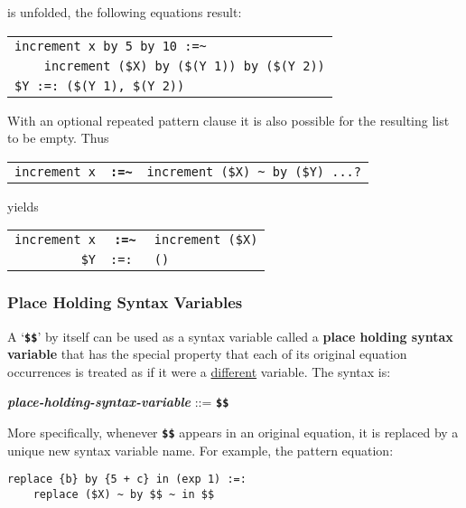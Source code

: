 \documentclass[12pt]{article}
\newcommand{\TT}[1]{{\tt \bfseries #1}}
\newcommand{\key}[1]{{\rm \bfseries #1}}
\newcommand{\ttkey}[1]{{\tt \bfseries #1}}
\newcommand{\emkey}[1]{{\em \bfseries #1}}
\newcommand{\TILDE}{\textasciitilde}
\newenvironment{indpar}[1][0.3in]%
	{\begin{list}{}%
		     {\setlength{\itemsep}{0in}%
		      \setlength{\topsep}{0in}%
		      \setlength{\parsep}{1ex}%
		      \setlength{\labelwidth}{#1}%
		      \setlength{\leftmargin}{#1}%
		      \addtolength{\leftmargin}{\labelsep}}%
	 \item}%
	{\end{list}}
\begin{document}
is unfolded, the following equations result:

\begin{center}
\begin{tabular}{l}
\verb/increment x by 5 by 10 :=~/ \\
\verb/    increment ($X) by ($(Y 1)) by ($(Y 2))/ \\
\verb/$Y :=: ($(Y 1), $(Y 2))/
\end{tabular}
\end{center}

With an optional repeated pattern clause it is also possible for the
resulting list to be empty.  Thus

\begin{center}
\begin{tabular}{rcl}
\verb/increment x/ & \TT{:=\TILDE}
			      & \verb/increment ($X) ~ by ($Y) ...?/ \\
\end{tabular}
\end{center}

yields

\begin{center}
\begin{tabular}{rcl}
\verb/increment x/ & \TT{:=\TILDE}
			      & \verb/increment ($X)/ \\
\verb/$Y/ & \tt :=: & \verb|()|
\end{tabular}
\end{center}

\subsubsection{Place Holding Syntax Variables}
\label{PLACE-HOLDING-SYNTAX-VARIABLES}

A `\TT{\$\$}' by itself can be used as a syntax variable called
a \key{place holding syntax variable} that has the special
property that each of its original equation occurrences
is treated as if it were a \underline{different} variable.  The syntax is:

\begin{indpar}
\emkey{place-holding-syntax-variable} ::= \ttkey{\$\$}
\end{indpar}

More specifically, whenever \TT{\$\$} appears in an original
equation, it is replaced by a unique new syntax variable name. 
For example, the pattern equation:

\begin{indpar}
\verb/replace {b} by {5 + c} in (exp 1) :=:/ \\
\verb/    replace ($X) ~ by $$ ~ in $$/
\end{indpar}
\end{document}
